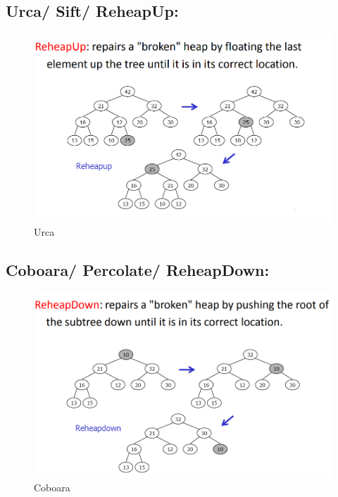 \documentclass[11pt,a4paper]{article}
\theoremstyle{definition}
\theoremstyle{plain}
\theoremstyle{remark}
\begin{document}
\subsection*{Urca/ Sift/ ReheapUp: }
\begin{figure}[H]
    \centering
    \includegraphics[width=0.8\linewidth]{image2.png}
    \caption{Urca}
    \label{fig:enter-label}
\end{figure}

\subsection*{Coboara/ Percolate/ ReheapDown: }
\begin{figure}[H]
    \centering
    \includegraphics[width=0.8\linewidth]{image.png}
    \caption{Coboara}
    \label{fig:enter-label}
\end{figure}
\end{document}
